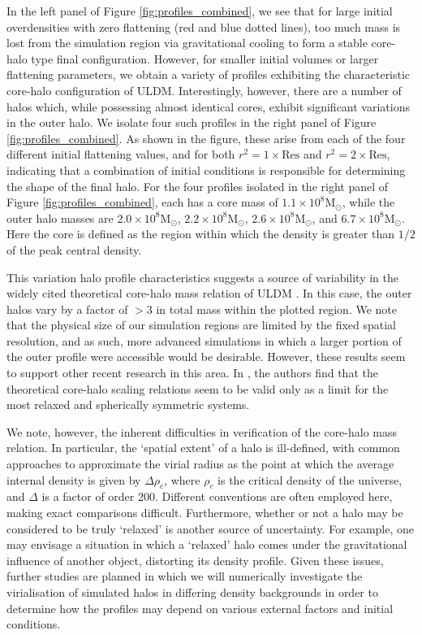 \documentclass[a4paper,11pt]{article}
\begin{document}
In the left panel of Figure \ref{fig:profiles_combined}, we see that for large initial overdensities with zero flattening (red and blue dotted lines), too much mass is lost from the simulation region via gravitational cooling to form a stable core-halo type final configuration. However, for smaller initial volumes or larger flattening parameters, we obtain a variety of profiles exhibiting the characteristic core-halo configuration of ULDM. Interestingly, however, there are a number of halos which, while possessing almost identical cores, exhibit significant variations in the outer halo. We isolate four such profiles in the right panel of Figure \ref{fig:profiles_combined}. As shown in the figure, these arise from each of the four different initial flattening values, and for both $r^2 =  1\times\mathrm{Res}$ and $r^2 =  2\times\mathrm{Res}$, indicating that a combination of initial conditions is responsible for determining the shape of the final halo. For the four profiles isolated in the right panel of Figure \ref{fig:profiles_combined}, each has a core mass of $1.1\times 10^{8}$M$_\odot$, while the outer halo masses are $2.0\times 10^{8}$M$_\odot$, $2.2\times 10^{8}$M$_\odot$, $2.6\times 10^{8}$M$_\odot$, and $6.7\times 10^{8}$M$_\odot$. Here the core is defined as the region within which the density is greater than $1/2$ of the peak central density. 

This variation halo profile characteristics suggests a source of variability in the widely cited theoretical core-halo mass relation of ULDM \cite{Schive:2014hza}. In this case, the outer halos vary by a factor of $>3$ in total mass within the plotted region. We note that the physical size of our simulation regions are limited by the fixed spatial resolution, and as such, more advanced simulations in which a larger portion of the outer profile were accessible would be desirable. However, these results seem to support other recent research in this area. In \cite{Nori:2020jzx}, the authors find that the theoretical core-halo scaling relations seem to be valid only as a limit for the most relaxed and spherically symmetric systems. 

We note, however, the inherent difficulties in verification of the core-halo mass relation. In particular, the `spatial extent' of a halo is ill-defined, with common approaches to approximate the virial radius as the point at which the average internal density is given by $\Delta\rho_c$, where $\rho_c$ is the critical density of the universe, and $\Delta$ is a factor of order 200. Different conventions are often employed here, making exact comparisons difficult. Furthermore, whether or not a halo may be considered to be truly `relaxed' is another source of uncertainty. For example, one may envisage a situation in which a `relaxed' halo comes under the gravitational influence of another object, distorting its density profile. Given these issues, further studies are planned in which we will numerically investigate the virialisation of simulated halos in differing density backgrounds in order to determine how the profiles may depend on various external factors and initial conditions. 
\end{document}
